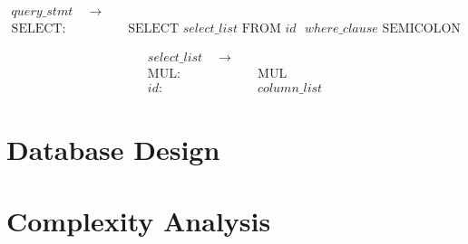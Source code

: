 \documentclass{article}
\begin{document}
\begin{align*}
query\_stmt \quad  \to & \quad\\
\text{SELECT}: & \quad \text{SELECT } select\_list \text{ FROM } id \text{ } where\_clause \text{ SEMICOLON}
\end{align*}

\begin{align*}
select\_list \quad  \to & \quad\\
\text{MUL}: & \quad \text{MUL} \\
id: & \quad column\_list
\end{align*}

\section{Database Design}

\section{Complexity Analysis}
\end{document}

